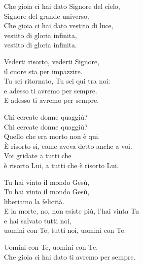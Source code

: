 
\strofa Che gioia ci hai dato Signore del cielo,\\
Signore del grande universo.\\
Che gioia ci hai dato vestito di luce,\\
vestito di gloria infinita,\\
vestito di gloria infinita.

\spazio

\strofa Vederti risorto, vederti Signore,\\
il cuore sta per impazzire.\\
Tu sei ritornato, Tu sei qui tra noi:\\
e adesso ti avremo per sempre.\\
E adesso ti avremo per sempre.

\spazio

\strofa Chi cercate donne quaggiù?\\
Chi cercate donne quaggiù?\\
Quello che era morto non è qui.\\
È risorto sì, come aveva detto anche a voi.\\
Voi gridate a tutti che\\
è risorto Lui, a tutti che è risorto Lui.

\spazio

\strofa Tu hai vinto il mondo Gesù,\\
Tu hai vinto il mondo Gesù,\\
liberiamo la felicità.\\
E la morte, no, non esiste più, l'hai vinta Tu\\
e hai salvato tutti noi,\\
uomini con Te, tutti noi, uomini con Te.

\spazio

Uomini con Te, uomini con Te.\\
Che gioia ci hai dato ti avremo per sempre.